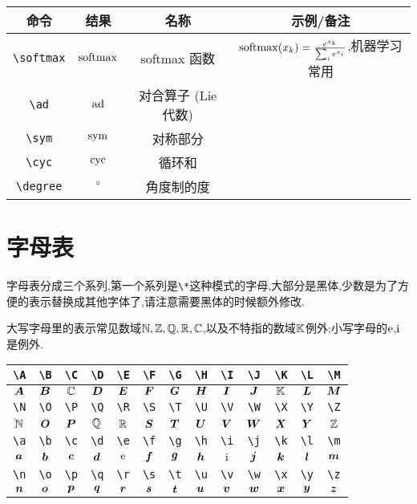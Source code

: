 \documentclass[lang=cn,12pt,scheme=chinese,mode=simple,black]{elegantbook}
\begin{document}
\begin{center}
\setlength{\tabcolsep}{10pt}
\begin{tabular}{|c|c|c|c|}
\hline
\textbf{命令} & \textbf{结果} & \textbf{名称} & \textbf{示例/备注}\\
\hline
\verb|\softmax| & $\softmax$ & softmax 函数 & $\softmax(x_k)=\frac{e^{x_k}}{\sum_i e^{x_i}}$,机器学习常用\\
\verb|\ad| & $\ad$ & 对合算子 (Lie 代数) & \\
\verb|\sym| & $\sym$ & 对称部分 & \\
\verb|\cyc| & $\cyc$ & 循环和 & \\
\verb|\degree| & $\degree$ & 角度制的度 & \\
\hline
\end{tabular}
\end{center}


\newpage
\section{字母表}
字母表分成三个系列,第一个系列是\verb|\*|这种模式的字母,大部分是黑体,少数是为了方便的表示替换成其他字体了,请注意需要黑体的时候额外修改.

大写字母里的表示常见数域$\N,\Z,\Q,\R,\C$,以及不特指的数域$\K$例外;小写字母的$\e$,$\i$是例外.
\begin{center}
\renewcommand{\arraystretch}{1.4}
\begin{tabular}{|c|c|c|c|c|c|c|c|c|c|c|c|c|}
\hline\hline
\verb|\A| & \verb|\B| & \verb|\C| & \verb|\D| & \verb|\E| & \verb|\F| & \verb|\G| & \verb|\H| & \verb|\I| & \verb|\J| & \verb|\K| & \verb|\L| & \verb|\M|\\
\hline
$\A$ & $\B$ & $\C$ & $\D$ & $\E$ & $\F$ & $\G$ & $\H$ & $\I$ & $\J$ & $\K$ & $\L$ & $\M$\\
\hline\hline
\verb|\N| & \verb|\O| & \verb|\P| & \verb|\Q| & \verb|\R| & \verb|\S| & \verb|\T| & \verb|\U| & \verb|\V| & \verb|\W| & \verb|\X| & \verb|\Y| & \verb|\Z|\\
\hline
$\N$ & $\O$ & $\P$ & $\Q$ & $\R$ & $\S$ & $\T$ & $\U$ & $\V$ & $\W$ & $\X$ & $\Y$ & $\Z$\\
\hline\hline
\verb|\a| & \verb|\b| & \verb|\c| & \verb|\d| & \verb|\e| & \verb|\f| & \verb|\g| & \verb|\h| & \verb|\i| & \verb|\j| & \verb|\k| & \verb|\l| & \verb|\m|\\
\hline
$\a$ & $\b$ & $\c$ & $\d$ & $\e$ & $\f$ & $\g$ & $\h$ & $\i$ & $\j$ & $\k$ & $\l$ & $\m$\\
\hline\hline
\verb|\n| & \verb|\o| & \verb|\p| & \verb|\q| & \verb|\r| & \verb|\s| & \verb|\t| & \verb|\u| & \verb|\v| & \verb|\w| & \verb|\x| & \verb|\y| & \verb|\z|\\
\hline
$\n$ & $\o$ & $\p$ & $\q$ & $\r$ & $\s$ & $\t$ & $\u$ & $\v$ & $\w$ & $\x$ & $\y$ & $\z$\\
\hline\hline
\end{tabular}
\end{center}
\end{document}
